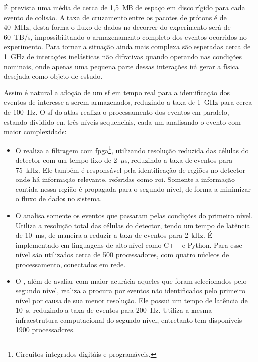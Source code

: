 É prevista uma média de cerca de 1,5~MB de espaço em disco rígido para cada evento de 
colisão. A taxa de cruzamento entre os pacotes de prótons é de 40~MHz, 
desta forma o fluxo de dados no decorrer do experimento será de 60~TB/s, impossibilitando o
armazenamento completo dos eventos ocorridos no experimento. Para tornar a
situação ainda mais complexa são esperadas cerca de 1~GHz de interações
inelásticas não difrativas quando operando nas condições nominais, onde apenas
uma pequena parte dessas interações irá gerar a física desejada como objeto de
estudo.

Assim é natural a adoção de um \glsdesc{sf} em tempo real para a
identificação dos eventos de interesse a serem armazenados, reduzindo a taxa de 1~GHz
para cerca de 100~Hz. O \glsdesc{sf} do \gls{atlas} realiza o processamento dos 
eventos em paralelo, estando dividido em três níveis sequenciais, cada um 
analisando o evento com maior complexidade:

\begin{itemize}
\item O  realiza a filtragem com
\gls{fpga}\footnote{Circuitos integrados digitáis e programáveis.}, 
utilizando resolução reduzida das células do detector
com um tempo fixo de 2~$\mu$s, reduzindo a taxa de eventos para
75~kHz. Ele também é responsável pela identificação de regiões no detector onde
há informação relevante, referidas como \gls{roi}. Somente a
informação contida nessa região é propagada para o segundo nível, de forma a
minimizar o fluxo de dados no sistema.
\item O  analisa somente os eventos que passaram pelas condições do
primeiro nível. Utiliza a resolução total das células do detector, 
tendo um tempo de latência de 10~ms, de maneira a reduzir a taxa de eventos para
2~kHz. É implementado em linguagens de alto nível como C++ e Python. 
Para esse nível são utilizados cerca de 500 processadores, com quatro
núcleos de processamento, conectados em rede.
\item O , além de avaliar com maior acurácia aqueles que foram
selecionados pelo segundo nível, realiza a procura por eventos não identificados pelo
primeiro nível por causa de sua menor resolução. Ele possui um tempo de 
latência de 10~s, reduzindo a taxa de eventos para 200~Hz. Utiliza a mesma
infraestrutura computacional do segundo nível, entretanto tem disponíveis 1900
processadores.
\end{itemize}

